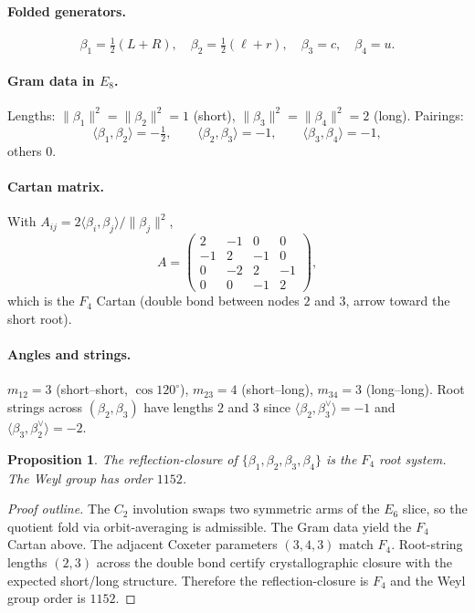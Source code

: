 \documentclass[12pt]{article}
\newtheorem{proposition}[theorem]{Proposition}
\begin{document}
\paragraph{Folded generators.}
\[
\beta_1=\tfrac12(L+R),\quad
\beta_2=\tfrac12(\ell+r),\quad
\beta_3=c,\quad
\beta_4=u .
\]

\paragraph{Gram data in $E_8$.}
Lengths:
\(
\|\beta_1\|^2=\|\beta_2\|^2=1\) (short), \(
\|\beta_3\|^2=\|\beta_4\|^2=2\) (long).
Pairings:
\[
\langle\beta_1,\beta_2\rangle=-\tfrac12,\qquad
\langle\beta_2,\beta_3\rangle=-1,\qquad
\langle\beta_3,\beta_4\rangle=-1,
\]
others $0$.

\paragraph{Cartan matrix.}
With $A_{ij}=2\langle\beta_i,\beta_j\rangle/\|\beta_j\|^2$,
\[
A=
\begin{pmatrix}
2&-1&0&0\\
-1&2&-1&0\\
0&-2&2&-1\\
0&0&-1&2
\end{pmatrix},
\]
which is the $F_4$ Cartan (double bond between nodes $2$ and $3$, arrow toward the short root).

\paragraph{Angles and strings.}
$m_{12}=3$ (short–short, $\cos120^\circ$), $m_{23}=4$ (short–long), $m_{34}=3$ (long–long). Root strings across $(\beta_2,\beta_3)$ have lengths $2$ and $3$ since $\langle\beta_2,\beta_3^\vee\rangle=-1$ and $\langle\beta_3,\beta_2^\vee\rangle=-2$.

\begin{proposition}
The reflection-closure of $\{\beta_1,\beta_2,\beta_3,\beta_4\}$ is the $F_4$ root system. The Weyl group has order $1152$.
\end{proposition}

\begin{proof}[Proof outline]
The $C_2$ involution swaps two symmetric arms of the $E_6$ slice, so the quotient fold via orbit-averaging is admissible. The Gram data yield the $F_4$ Cartan above. The adjacent Coxeter parameters $(3,4,3)$ match $F_4$. Root-string lengths $(2,3)$ across the double bond certify crystallographic closure with the expected short/long structure. Therefore the reflection-closure is $F_4$ and the Weyl group order is $1152$.
\end{proof}
\end{document}

